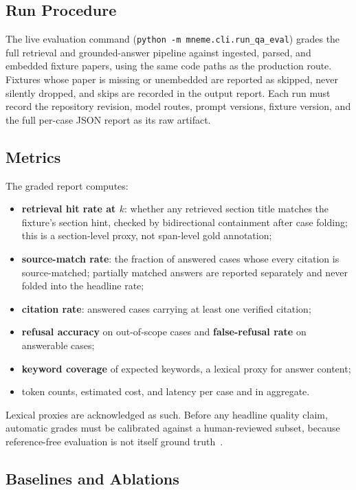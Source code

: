 \subsection{Run Procedure}

The live evaluation command (\texttt{python -m mneme.cli.run\_qa\_eval}) grades the full retrieval and grounded-answer pipeline against ingested, parsed, and embedded fixture papers, using the same code paths as the production route.
Fixtures whose paper is missing or unembedded are reported as skipped, never silently dropped, and skips are recorded in the output report.
Each run must record the repository revision, model routes, prompt versions, fixture version, and the full per-case JSON report as its raw artifact.

\subsection{Metrics}

The graded report computes:
\begin{itemize}
  \item \textbf{retrieval hit rate at \(k\)}: whether any retrieved section title matches the fixture's section hint, checked by bidirectional containment after case folding; this is a section-level proxy, not span-level gold annotation;
  \item \textbf{source-match rate}: the fraction of answered cases whose every citation is source-matched; partially matched answers are reported separately and never folded into the headline rate;
  \item \textbf{citation rate}: answered cases carrying at least one verified citation;
  \item \textbf{refusal accuracy} on out-of-scope cases and \textbf{false-refusal rate} on answerable cases;
  \item \textbf{keyword coverage} of expected keywords, a lexical proxy for answer content;
  \item token counts, estimated cost, and latency per case and in aggregate.
\end{itemize}
Lexical proxies are acknowledged as such.
Before any headline quality claim, automatic grades must be calibrated against a human-reviewed subset, because reference-free evaluation is not itself ground truth~\cite{es2024ragas,saadfalcon2024ares}.

\subsection{Baselines and Ablations}

